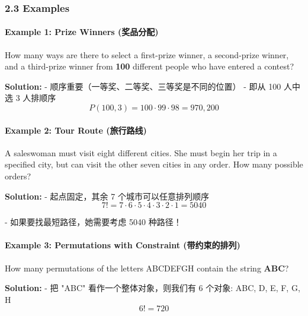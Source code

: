 \documentclass[10pt,a4paper,openany]{ctexbook}
\theoremstyle{definition}
\theoremstyle{remark}
\renewenvironment{quote}
  {\list{}{\leftmargin=1em\rightmargin=0pt\topsep=0.5pt\partopsep=0pt}\item[]}
  {\endlist}
\begin{document}
\subsubsection{2.3 Examples}

\paragraph{Example 1: Prize Winners (奖品分配)}

\begin{quote}
How many ways are there to select a first-prize winner, a second-prize winner, and a third-prize winner from \textbf{100} different people who have entered a contest?

\textbf{Solution:}
- 顺序重要（一等奖、二等奖、三等奖是不同的位置）
- 即从 100 人中选 3 人排顺序
\[
P(100, 3) = 100 \cdot 99 \cdot 98 = 970{,}200
\]


\end{quote}

\paragraph{Example 2: Tour Route (旅行路线)}

\begin{quote}
A saleswoman must visit eight different cities. She must begin her trip in a specified city, but can visit the other seven cities in any order. How many possible orders?

\textbf{Solution:}
- 起点固定，其余 7 个城市可以任意排列顺序
\[
7! = 7 \cdot 6 \cdot 5 \cdot 4 \cdot 3 \cdot 2 \cdot 1 = 5040
\]

- 如果要找最短路径，她需要考虑 5040 种路径！

\end{quote}

\paragraph{Example 3: Permutations with Constraint (带约束的排列)}

\begin{quote}
How many permutations of the letters ABCDEFGH contain the string \textbf{ABC}?

\textbf{Solution:}
- 把 "ABC" 看作一个整体对象，则我们有 6 个对象: ABC, D, E, F, G, H
\[
6! = 720
\]


\end{quote}
\vspace{-2pt}
\end{document}
